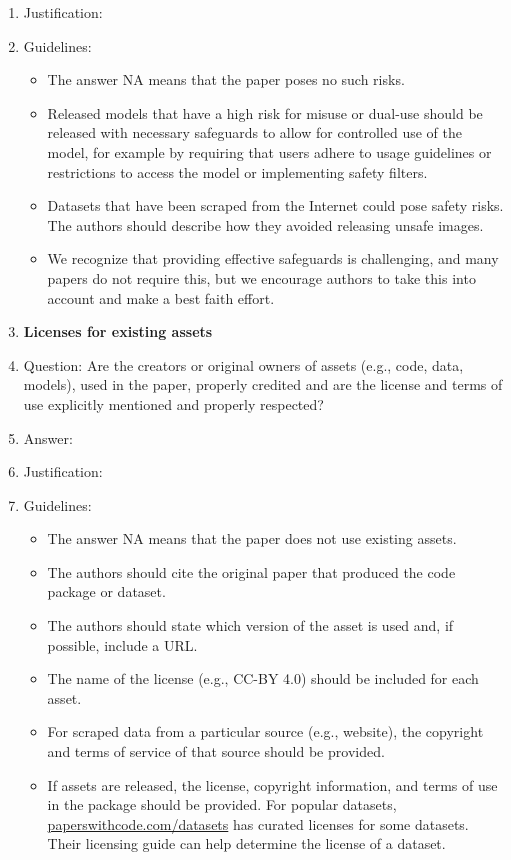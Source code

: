 \documentclass{article}
\begin{document}
\begin{enumerate}
    \item[] Justification: \justificationTODO{}
    \item[] Guidelines:
    \begin{itemize}
        \item The answer NA means that the paper poses no such risks.
        \item Released models that have a high risk for misuse or dual-use should be released with necessary safeguards to allow for controlled use of the model, for example by requiring that users adhere to usage guidelines or restrictions to access the model or implementing safety filters.
        \item Datasets that have been scraped from the Internet could pose safety risks. The authors should describe how they avoided releasing unsafe images.
        \item We recognize that providing effective safeguards is challenging, and many papers do not require this, but we encourage authors to take this into account and make a best faith effort.
    \end{itemize}
\item {\bf Licenses for existing assets}
    \item[] Question: Are the creators or original owners of assets (e.g., code, data, models), used in the paper, properly credited and are the license and terms of use explicitly mentioned and properly respected?
    \item[] Answer: \answerYes{}
    \item[] Justification: \justificationTODO{}
    \item[] Guidelines:
    \begin{itemize}
        \item The answer NA means that the paper does not use existing assets.
        \item The authors should cite the original paper that produced the code package or dataset.
        \item The authors should state which version of the asset is used and, if possible, include a URL.
        \item The name of the license (e.g., CC-BY 4.0) should be included for each asset.
        \item For scraped data from a particular source (e.g., website), the copyright and terms of service of that source should be provided.
        \item If assets are released, the license, copyright information, and terms of use in the package should be provided. For popular datasets, \url{paperswithcode.com/datasets} has curated licenses for some datasets. Their licensing guide can help determine the license of a dataset.

\end{itemize}
\end{enumerate}
\end{document}
